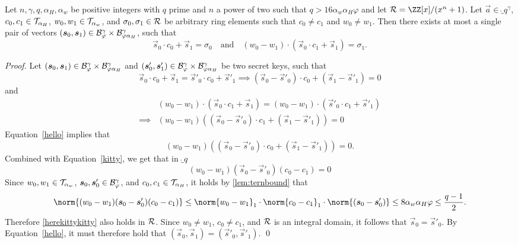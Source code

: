 \begin{lemma}\label{lem:nilssupportivechildsupport}
Let $n,\gamma,q,\alpha_H, \alpha_w$ be positive integers with $q$ prime and $n$ a power of two such that $q > 16 \alpha_w \alpha_H\varphi$ and let $\ring=\ZZ[x]/(x^n+1)$. Let $\vec{a}\in\ring_q^\gamma$, $c_0,c_1 \in \mathcal{T}_{\alpha_{H}}$, $w_0, w_1 \in \mathcal{T}_{\alpha_w}$, and $\sigma_0,\sigma_1 \in \mathcal{R}$ be arbitrary ring elements such that $c_0\neq c_1$ and $w_0 \neq w_1$. Then there exists at most a single pair of vectors $(\boldsymbol{s}_0,\boldsymbol{s}_1)\in\mathcal{B}^\gamma_{\varphi}\times \mathcal{B}^\gamma_{\varphi\alpha_H}$, such that
    \[\vec{s}_0\cdot c_0 + \vec{s}_1 = \sigma_0 \quad\text{and}\quad (w_0 - w_1) \cdot (\vec{s}_0\cdot c_1 + \vec{s}_1) = \sigma_1.\]
\end{lemma}
 \begin{proof}
    Let $(\boldsymbol{s}_0, \boldsymbol{s}_1)\in\mathcal{B}^\gamma_{\varphi}\times \mathcal{B}^\gamma_{\varphi\alpha_H}$ and $(\boldsymbol{s}'_0, \boldsymbol{s}'_1)\in\mathcal{B}^\gamma_{\varphi}\times \mathcal{B}^\gamma_{\varphi\alpha_H}$ be two secret keys, such that 
    \begin{equation}
    \vec{s}_0\cdot c_0 + \vec{s}_1 = \vec{s}'_0\cdot c_0 + \vec{s}'_1 \implies (\vec{s}_0 - \vec{s}'_0)\cdot c_0 + (\vec{s}_1 - \vec{s}'_1) = 0 \label{hello}
    \end{equation}
    and 
    \begin{equation}
    \begin{aligned}
    &(w_0 - w_1) \cdot (\vec{s}_0\cdot c_1 + \vec{s}_1) = (w_0 - w_1) \cdot (\vec{s}'_0\cdot c_1 + \vec{s}'_1)\\ \implies& (w_0 - w_1)((\vec{s}_0 - \vec{s}'_0)\cdot c_1 + (\vec{s}_1 - \vec{s}'_1)) = 0 \label{kitty}
    \end{aligned}
    \end{equation}
    Equation~\ref{hello} implies that 
    \[
    (w_0 - w_1)((\vec{s}_0 - \vec{s}'_0)\cdot c_0 + (\vec{s}_1 - \vec{s}'_1)) = 0.
    \]
    Combined with Equation~\ref{kitty}, we get that in $\ring_q$
    \begin{equation}
    (w_0 - w_1)(\vec{s}_0 - \vec{s}'_0) (c_0 - c_1)  = 0 \label{herekittykitty}
    \end{equation}
    Since $w_0,w_1\in\mathcal{T}_{\alpha_w}$, $\boldsymbol{s}_0,\boldsymbol{s}'_0 \in \mathcal{B}^\gamma_{\varphi}$, and $c_0,c_1\in\mathcal{T}_{\alpha_{H}}$, it holds by \autoref{lem:ternbound} that
    \[
      \norm{(w_0 - w_1)(\vec{s}_0 - \vec{s}'_0) (c_0 - c_1)} \leq \norm{w_0 - w_1}_1\cdot\norm{c_0 - c_1}_1\cdot \norm{(\vec{s}_0 - \vec{s}'_0)} \leq 8\alpha_w\alpha_H\varphi \leq \frac{q-1}{2}.
    \]
    Therefore \autoref{herekittykitty} also holds in $\mathcal{R}$.
    Since $w_0 \neq w_1$, $c_0 \neq c_1$, and $\mathcal{R}$ is an integral domain, it follows that $\vec{s}_0 = \vec{s}'_0$.
    By Equation~\ref{hello}, it must therefore hold that $(\vec{s}_0, \vec{s}_1) = (\vec{s}'_0, \vec{s}'_1)$.
    \qed
\end{proof}
